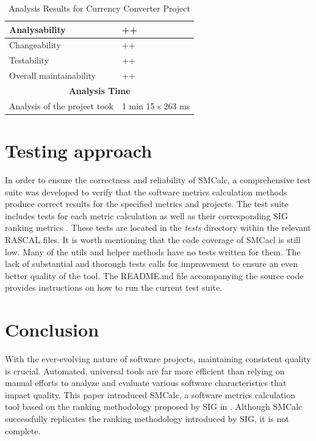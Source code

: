 \documentclass[11pt]{report}
\begin{document}
\begin{table}[H]
\begin{tabular}{|l|l|}
        \hline
        Analysability & ++ \\
        \hline
        Changeability & ++ \\
        \hline
        Testability & ++ \\
        \hline
        Overall maintainability & ++ \\
        \hline
        \multicolumn{2}{|c|}{\textbf{Analysis Time}} \\
        \hline
        Analysis of the project took & 1 min 15 s 263 ms \\
        \hline
    \end{tabular}
    \caption{Analysis Results for Currency Converter Project}
    \label{tab:analysis-results}
\end{table}

\chapter{Testing approach}
\label{chap:testing}

In order to ensure the correctness and reliability of SMCalc, a comprehensive test suite was developed to verify that the software metrics calculation methods produce correct results for the specified metrics and projects. The test suite includes tests for each metric calculation as well as their corresponding SIG ranking metrics \cite{Heitlager2007}. These tests are located in the \textit{tests} directory within the relevant RASCAL files. It is worth mentioning that the code coverage of SMCacl is still low. Many of the utils and helper methods have no tests written for them. The lack of substantial and thorough tests calls for improvement to ensure an even better quality of the tool. The README.md file accompanying the source code provides instructions on how to run the current test suite.

\chapter{Conclusion}
\label{chap:conclusion}

With the ever-evolving nature of software projects, maintaining consistent quality is crucial. Automated, universal tools are far more efficient than relying on manual efforts to analyze and evaluate various software characteristics that impact quality. This paper introduced SMCalc, a software metrics calculation tool based on the ranking methodology proposed by SIG in \cite{Heitlager2007}. Although SMCalc successfully replicates the ranking methodology introduced by SIG, it is not complete.
\end{document}

